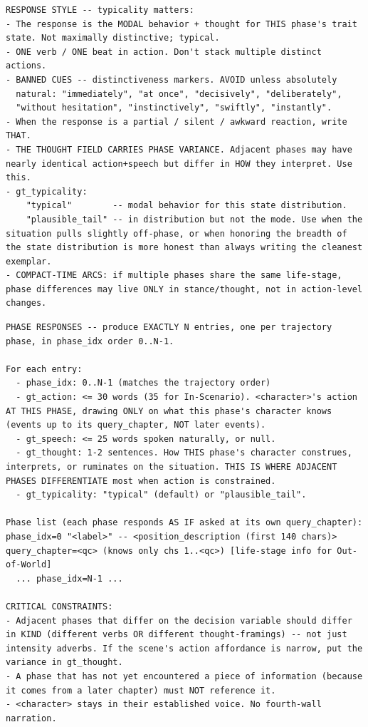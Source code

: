 \documentclass[11pt]{article}
\begin{document}
\begin{table}[htbp]
\begin{lstlisting}[basicstyle=\ttfamily\scriptsize]
RESPONSE STYLE -- typicality matters:
- The response is the MODAL behavior + thought for THIS phase's trait state. Not maximally distinctive; typical.
- ONE verb / ONE beat in action. Don't stack multiple distinct actions.
- BANNED CUES -- distinctiveness markers. AVOID unless absolutely
  natural: "immediately", "at once", "decisively", "deliberately",
  "without hesitation", "instinctively", "swiftly", "instantly".
- When the response is a partial / silent / awkward reaction, write THAT.
- THE THOUGHT FIELD CARRIES PHASE VARIANCE. Adjacent phases may have nearly identical action+speech but differ in HOW they interpret. Use this.
- gt_typicality:
    "typical"        -- modal behavior for this state distribution.
    "plausible_tail" -- in distribution but not the mode. Use when the situation pulls slightly off-phase, or when honoring the breadth of the state distribution is more honest than always writing the cleanest exemplar.
- COMPACT-TIME ARCS: if multiple phases share the same life-stage, phase differences may live ONLY in stance/thought, not in action-level changes.
\end{lstlisting}
\end{table}

\begin{table}[htbp]
\centering
\caption{Shared phase-response instructions (\texttt{\_phase\_response\_instructions}). Inlined verbatim into the user message of the three probe designers.}
\label{tab:prompt-phase-instructions}
\begin{lstlisting}[basicstyle=\ttfamily\scriptsize]
PHASE RESPONSES -- produce EXACTLY N entries, one per trajectory phase, in phase_idx order 0..N-1.

For each entry:
  - phase_idx: 0..N-1 (matches the trajectory order)
  - gt_action: <= 30 words (35 for In-Scenario). <character>'s action AT THIS PHASE, drawing ONLY on what this phase's character knows (events up to its query_chapter, NOT later events).
  - gt_speech: <= 25 words spoken naturally, or null.
  - gt_thought: 1-2 sentences. How THIS phase's character construes, interprets, or ruminates on the situation. THIS IS WHERE ADJACENT PHASES DIFFERENTIATE most when action is constrained.
  - gt_typicality: "typical" (default) or "plausible_tail".

Phase list (each phase responds AS IF asked at its own query_chapter): phase_idx=0 "<label>" -- <position_description (first 140 chars)> query_chapter=<qc> (knows only chs 1..<qc>) [life-stage info for Out-of-World]
  ... phase_idx=N-1 ...

CRITICAL CONSTRAINTS:
- Adjacent phases that differ on the decision variable should differ in KIND (different verbs OR different thought-framings) -- not just intensity adverbs. If the scene's action affordance is narrow, put the variance in gt_thought.
- A phase that has not yet encountered a piece of information (because it comes from a later chapter) must NOT reference it.
- <character> stays in their established voice. No fourth-wall narration.
\end{lstlisting}
\end{table}
\end{document}
